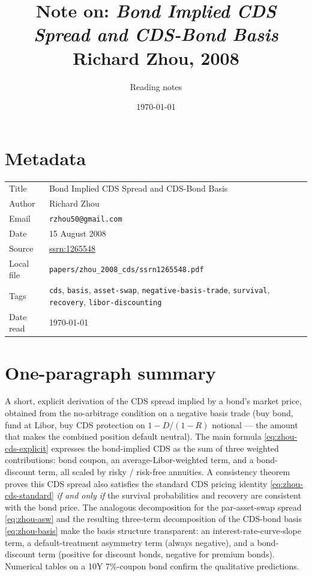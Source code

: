 \documentclass[11pt,a4paper]{article}
\title{Note on: \emph{Bond Implied CDS Spread and CDS-Bond Basis}\\
       \large Richard Zhou, 2008}
\author{Reading notes}
\date{\today}
\begin{document}
\maketitle

\section*{Metadata}
\begin{tabular}{@{}p{3.5cm}p{11cm}@{}}
\toprule
Title           & Bond Implied CDS Spread and CDS-Bond Basis \\
Author          & Richard Zhou \\
Email           & \texttt{rzhou50@gmail.com} \\
Date            & 15 August 2008 \\
Source          & \href{https://ssrn.com/abstract=1265548}{ssrn:1265548} \\
Local file      & \texttt{papers/zhou\_2008\_cds/ssrn1265548.pdf} \\
Tags            & \texttt{cds}, \texttt{basis}, \texttt{asset-swap}, \texttt{negative-basis-trade},
                  \texttt{survival}, \texttt{recovery}, \texttt{libor-discounting} \\
Date read       & \today \\
\bottomrule
\end{tabular}

\section*{One-paragraph summary}
A short, explicit derivation of the CDS spread implied by a bond's
market price, obtained from the no-arbitrage condition on a negative
basis trade (buy bond, fund at Libor, buy CDS protection on
$1 - D / (1 - R)$ notional --- the amount that makes the combined
position default neutral). The main formula
\eqref{eq:zhou-cds-explicit} expresses the bond-implied CDS as the
sum of three weighted contributions: bond coupon, an
average-Libor-weighted term, and a bond-discount term, all scaled by
risky / risk-free annuities. A consistency theorem proves this CDS
spread also satisfies the standard CDS pricing identity
\eqref{eq:zhou-cds-standard} \emph{if and only if} the survival
probabilities and recovery are consistent with the bond price. The
analogous decomposition for the par-asset-swap spread
\eqref{eq:zhou-asw} and the resulting three-term decomposition of the
CDS-bond basis \eqref{eq:zhou-basis} make the basis structure
transparent: an interest-rate-curve-slope term, a default-treatment
asymmetry term (always negative), and a bond-discount term
(positive for discount bonds, negative for premium bonds). Numerical
tables on a 10Y 7\%-coupon bond confirm the qualitative predictions.
\end{document}
